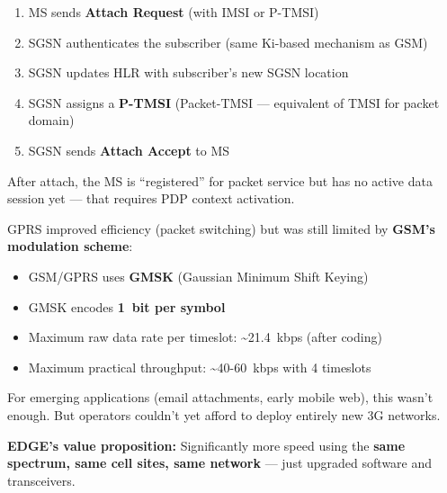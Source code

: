 \begin{enumerate}
\def\labelenumi{\arabic{enumi}.}
\tightlist
\item
  MS sends \textbf{Attach Request} (with IMSI or P-TMSI)
\item
  SGSN authenticates the subscriber (same Ki-based mechanism as GSM)
\item
  SGSN updates HLR with subscriber’s new SGSN location
\item
  SGSN assigns a \textbf{P-TMSI} (Packet-TMSI — equivalent of TMSI for packet domain)
\item
  SGSN sends \textbf{Attach Accept} to MS
\end{enumerate}

After attach, the MS is ``registered'' for packet service but has no active data session yet — that requires PDP context activation.



\CNchained{}

GPRS improved efficiency (packet switching) but was still limited by \textbf{GSM’s modulation scheme}:

\begin{itemize}
\tightlist
\item
  GSM/\allowbreak{}GPRS uses \textbf{GMSK} (Gaussian Minimum Shift Keying)
\item
  GMSK encodes \textbf{1~bit per symbol}
\item
  Maximum raw data rate per timeslot: \textasciitilde{}21.4~kbps (after coding)
\item
  Maximum practical throughput: \textasciitilde{}40-60~kbps with 4 timeslots
\end{itemize}

For emerging applications (email attachments, early mobile web), this wasn’t enough. But operators couldn’t yet afford to deploy entirely new 3G networks.

\textbf{EDGE’s value proposition:} Significantly more speed using the \textbf{same spectrum, same cell sites, same network} — just upgraded software and transceivers.




\CNchained{}

